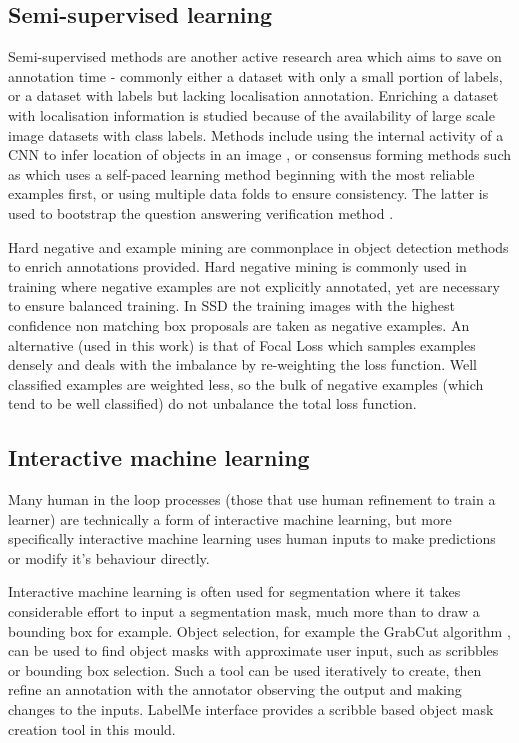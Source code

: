 \subsection{Semi-supervised learning}

Semi-supervised methods are another active research area which aims to save on annotation time - commonly either a dataset with only a small portion of labels, or a dataset with labels but lacking localisation annotation. Enriching a dataset with localisation information is studied because of the availability of large scale image datasets with class labels. Methods include using the internal activity of a \gls{CNN} to infer location of objects in an image \cite{Sivic2015}, or consensus forming methods such as \cite{Sangineto} which uses a self-paced learning method beginning with the most reliable examples first, or \cite{Cinbis2017} using multiple data folds to ensure consistency. The latter is used to bootstrap the question answering verification method \cite{Papadopoulos2016}.

Hard negative and example mining are commonplace in object detection methods to enrich annotations provided. Hard negative mining is commonly used in training where negative examples are not explicitly annotated, yet are necessary to ensure balanced training. In \gls{SSD} \cite{Liu2016a} the training images with the highest confidence non matching  box proposals are taken as negative examples. An alternative (used in this work) is that of Focal Loss \cite{Lin2017} which samples examples densely and deals with the imbalance by re-weighting the loss function. Well classified examples are weighted less, so the bulk of negative examples (which tend to be well classified) do not unbalance the total loss function.

\subsection{Interactive machine learning}

Many human in the loop processes (those that use human refinement to train a learner) are technically a form of interactive machine learning, but more specifically interactive machine learning uses human inputs to make predictions or modify it's behaviour directly.

Interactive machine learning is often used for segmentation where it takes considerable effort to input a segmentation mask, much more than to draw a bounding box for example. Object selection, for example the GrabCut algorithm \cite{Rother}, can be used to find object masks with approximate user input, such as scribbles or bounding box selection. Such a tool can be used iteratively to create, then refine an annotation with the annotator observing the output and making changes to the inputs.  LabelMe \cite{Russell2007} interface provides a scribble based object mask creation tool in this mould. 

